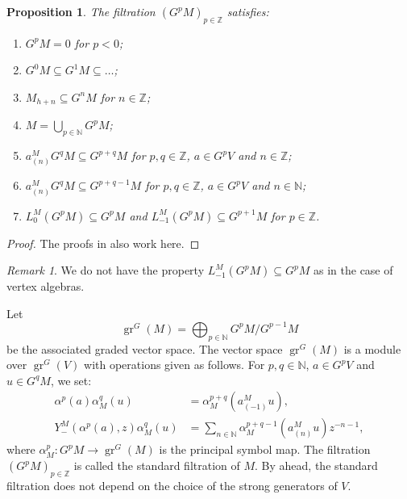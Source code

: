 \documentclass[a4paper, 12pt, reqno]{amsart}
\newtheorem{proposition}[theorem]{Proposition}
\theoremstyle{remark}
\newtheorem{remark}[theorem]{Remark}
\DeclareMathOperator{\gr}{gr}
\begin{document}
\begin{proposition}
  \label{prp:17}
  The filtration $(G^pM)_{p \in \mathbb{Z}}$ satisfies:
  \begin{enumerate}
  \item $G^pM = 0$ for $p < 0$;
  \item $G^0M \subseteq G^1M \subseteq \dots$;
  \item $M_{h + n} \subseteq G^nM$ for $n \in \mathbb{Z}$;
  \item $M = \bigcup_{p \in \mathbb{N}}G^pM$;
  \item $a^M_{(n)}G^qM \subseteq G^{p + q}M$ for $p, q \in \mathbb{Z}$, $a \in G^pV$ and $n \in \mathbb{Z}$;
  \item $a^M_{(n)}G^qM \subseteq G^{p + q - 1}M$ for $p, q \in \mathbb{Z}$, $a \in G^pV$ and $n \in \mathbb{N}$;
  \item $L^M_0(G^pM) \subseteq G^pM$ and $L^M_{-1}(G^pM) \subseteq G^{p + 1}M$ for $p \in \mathbb{Z}$.
  \end{enumerate}
\end{proposition}

\begin{proof}
  The proofs in \cite{li_vertex_2004} also work here.
\end{proof}

\begin{remark}
  \label{rmk:42}
  We do not have the property $L_{-1}^M(G^pM) \subseteq G^pM$ as in the case of vertex algebras.
\end{remark}

Let
\begin{equation*}
  \gr^G(M) = \bigoplus_{p \in \mathbb{N}}G^pM/G^{p - 1}M
\end{equation*}
be the associated graded vector space.
The vector space $\gr^G(M)$ is a module over $\gr^G(V)$ with operations given as follows.
For $p, q \in \mathbb{N}$, $a \in G^pV$ and $u \in G^qM$, we set:
\begin{align*}
  \alpha^p(a)\alpha_M^q(u) &= \alpha_M^{p + q}(a^M_{(-1)}u), \\
  Y^M_-(\alpha^p(a), z)\alpha_M^q(u) &= \sum_{n \in \mathbb{N}}\alpha_M^{p + q - 1}(a^M_{(n)}u)z^{-n - 1},
\end{align*}
where $\alpha_M^p: G^pM \to \gr^G(M)$ is the principal symbol map.
The filtration $(G^pM)_{p \in \mathbb{Z}}$ is called the standard filtration of $M$.
By  ahead, the standard filtration does not depend on the choice of the strong generators of $V$.
\end{document}
